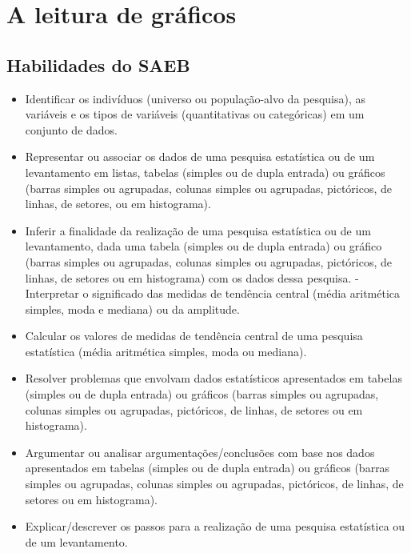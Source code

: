 

\chapter{A leitura de gráficos}

\section{Habilidades do SAEB} 
\begin{itemize}
\item Identificar os indivíduos (universo ou
população-alvo da pesquisa), as variáveis e os tipos de variáveis
(quantitativas ou categóricas) em um conjunto de dados.
\item
  Representar ou associar os dados de uma pesquisa estatística ou de um
  levantamento em listas, tabelas (simples ou de dupla entrada) ou
  gráficos (barras simples ou agrupadas, colunas simples ou agrupadas,
  pictóricos, de linhas, de setores, ou em histograma).
\item
  Inferir a finalidade da realização de uma pesquisa estatística ou de
  um levantamento, dada uma tabela (simples ou de dupla entrada) ou
  gráfico (barras simples ou agrupadas, colunas simples ou agrupadas,
  pictóricos, de linhas, de setores ou em histograma) com os dados dessa
  pesquisa. - Interpretar o significado das medidas de tendência central
  (média aritmética simples, moda e mediana) ou da amplitude.
\item
  Calcular os valores de medidas de tendência central de uma pesquisa
  estatística (média aritmética simples, moda ou mediana).
\item
  Resolver problemas que envolvam dados estatísticos apresentados em
  tabelas (simples ou de dupla entrada) ou gráficos (barras simples ou
  agrupadas, colunas simples ou agrupadas, pictóricos, de linhas, de
  setores ou em histograma).
\item
  Argumentar ou analisar argumentações/conclusões com base nos dados
  apresentados em tabelas (simples ou de dupla entrada) ou gráficos
  (barras simples ou agrupadas, colunas simples ou agrupadas,
  pictóricos, de linhas, de setores ou em histograma).
\item
  Explicar/descrever os passos para a realização de uma pesquisa
  estatística ou de um levantamento.
\end{itemize}

